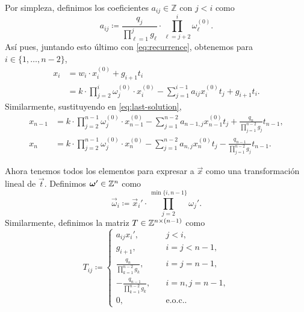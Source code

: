 Por simpleza, definimos los coeficientes $a_{ij} \in \mathbb{Z}$ con $j < i$ como
\begin{equation}
	\label{phase-2:eq:coeffs}
	a_{ij} \coloneq \frac{q_j}{\prod_{\ell = 1}^{j}g_\ell} \cdot \prod_{\ell = j +
	2}^{i}\omega_\ell^{(0)}.
\end{equation}
Así pues, juntando esto último con \ref{eq:recurrence}, obtenemos para $i \in \{1, \ldots, n -
2\}$, 
\begin{align}
	x_i &= w_i \cdot x_i^{(0)} + g_{i + 1}t_i \nonumber \\
		&= k \cdot \prod_{j=2}^{i}\omega_j^{(0)} \cdot x_i^{(0)} - \sum_{j=1}^{i - 1}a_{ij}x_i^{(0)}
		t_j + g_{i + 1}t_i \label{eq:x:i}.
\end{align}
Similarmente, sustituyendo en \ref{eq:last-solution},
\begin{align}
	x_{n-1} &= k \cdot \prod_{j=2}^{n-1} \omega_j^{(0)} \cdot x_{n-1}^{(0)} - \sum_{j=1}^{n-2}
	a_{n-1,j}x_{n-1}^{(0)} t_j + \frac{q_n}{\prod_{j=1}^{n-2}g_j} t_{n-1}, \label{eq:x:-1}\\
	x_{n} &= k \cdot \prod_{j=2}^{n-1} \omega_j^{(0)} \cdot x_{n}^{(0)} - \sum_{j=1}^{n-2}a_{n,j}x_n^{(0)}t_j -
	\frac{q_{n-1}}{\prod_{j=1}^{n-2} g_j}t_{n-1} \label{eq:x:last}.
\end{align}

Ahora tenemos todos los elementos para expresar a $\vec{x}$ como una transformación lineal de
$\vec{t}$. Definimos $\boldsymbol{\omega}' \in \mathbb{Z}^n$ como
\begin{equation}
	\label{eq:vec-omega}
	\vec{\omega}_i \coloneq \vec{x}_i' \cdot \prod_{j = 2}^{\min{\lbrace i, n - 1 \rbrace}}\omega_j'.
\end{equation}
Similarmente, definimos la matriz $T \in \mathbb{Z}^{n \times (n - 1)}$ como
\begin{equation}
	\label{eq:mat-T}
	T_{ij} \coloneq \begin{cases}
		a_{ij}x_i', &\quad j < i, \\
		g_{i + 1},  &\quad i = j < n - 1, \\
		\frac{q_n}{\prod_{k=1}^{n-2}g_k}, &\quad i = j = n - 1, \\
		-\frac{q_{n-1}}{\prod_{k=1}^{n-2}g_k}, &\quad i = n, j = n - 1, \\
		0, &\quad \text{e.o.c.}.
	\end{cases}
\end{equation}

